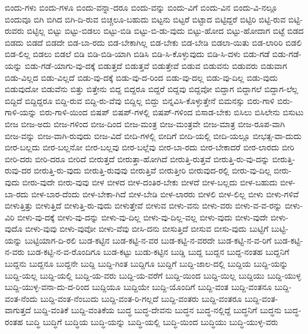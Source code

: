 {ಬಿಂದು-ಗಳು
ಬಿಂದು-ಗಳೂ
ಬಿಂದು-ವನ್ನಾ-ದರೂ
ಬಿಂದು-ವನ್ನು
ಬಿಂದು-ವಿಗೆ
ಬಿಂದು-ವಿನ
ಬಿಂದು-ವಿ-ನಲ್ಲೂ
ಬಿಂದುವೂ
ಬಿಗಿ
ಬಿಗಿದ
ಬಿಗಿ-ದಿ-ರುವ
ಬಿಚ್ಚಲೂ-ಬಹುದು
ಬಿಟ್ಟನು
ಬಿಟ್ಟರೆ
ಬಿಟ್ಟಾದ
ಬಿಟ್ಟಿದ್ದರೆ
ಬಿಟ್ಟಿರಿ
ಬಿಟ್ಟಿ-ರುವ
ಬಿಟ್ಟಿ-ರುವರು
ಬಿಟ್ಟಿಲ್ಲ
ಬಿಟ್ಟು
ಬಿಟ್ಟು-ಬಿಡಲು
ಬಿಟ್ಟು-ಬಿಡಿ
ಬಿಟ್ಟು-ಬಿ-ಡು-ವುದು
ಬಿಟ್ಟು-ಹೋದ
ಬಿಟ್ಟು-ಹೋದಾಗ
ಬಿಟ್ಟೆ
ಬಿಡದ
ಬಿಡದು
ಬಿಡದೆ
ಬಿಡದೇ
ಬಿಡ-ಬಾ-ರದು
ಬಿಡ-ಬೇಕಾಗಿಲ್ಲ
ಬಿಡ-ಬೇಕು
ಬಿಡ-ಬೇಡಿ
ಬಿಡಲಾ-ಯಿತು
ಬಿಡ-ಲಾರಿರಿ
ಬಿಡಲಿ
ಬಿಡ-ಲಿಲ್ಲ
ಬಿಡಲು
ಬಿಡಲೆ
ಬಿಡಿ
ಬಿಡಿ-ಬಿಡಿ-ಯಾಗಿ
ಬಿಡಿಸಿ
ಬಿಡಿ-ಸಿ-ಕೊಳ್ಳುವುದು
ಬಿಡಿ-ಸಿ-ದಳು
ಬಿಡು-ಗಡೆ
ಬಿಡು-ಗಡೆ-ಯನ್ನು
ಬಿಡು-ಗಡೆ-ಯಾಗು-ವು-ದಕ್ಕೆ
ಬಿಡುತ್ತದೆ
ಬಿಡುತ್ತವೆ
ಬಿಡುತ್ತೇವೆ
ಬಿಡುವ
ಬಿಡುವನು
ಬಿಡುವರು
ಬಿಡುವಾಗ
ಬಿಡು-ವಿಲ್ಲದ
ಬಿಡು-ವಿಲ್ಲದೆ
ಬಿಡು-ವು-ದಕ್ಕೆ
ಬಿಡು-ವು-ದ-ರಿಂದ
ಬಿಡು-ವು-ದಲ್ಲ
ಬಿಡು-ವು-ದಿಲ್ಲ
ಬಿಡು-ವುದು
ಬಿಡುವುದೋ
ಬಿಡುವೆನು
ಬಿತ್ತು
ಬಿತ್ತೇನು
ಬಿದ್ದ
ಬಿದ್ದರೂ
ಬಿದ್ದರೆ
ಬಿದ್ದವು
ಬಿದ್ದವೋ
ಬಿದ್ದಾಗ
ಬಿದ್ದಾಗಲೆ
ಬಿದ್ದಾಗ-ಲೆಲ್ಲ
ಬಿದ್ದಿದೆ
ಬಿದ್ದಿದ್ದರೂ
ಬಿದ್ದಿ-ರುವ
ಬಿದ್ದಿ-ರು-ವೆವು
ಬಿದ್ದಿಲ್ಲ
ಬಿದ್ದು
ಬಿನ್ನವಿಸಿ-ಕೊಳ್ಳುತ್ತೇನೆ
ಬಿಮನಸ್ಸು
ಬಿರು-ಗಾಳಿ
ಬಿರು-ಗಾಳಿ-ಯನ್ನು
ಬಿರು-ಗಾಳಿ-ಯಿಂದ
ಬಿಷಪ್
ಬಿಷಪ್-ಗಳಲ್ಲಿ
ಬಿಷಪ್-ಗಳಿಂದ
ಬಿಸಾಡ-ಬೇಕು
ಬಿಸಿಲು
ಬಿಸಿಲೇನು
ಬಿಸುಟು
ಬೀಜ
ಬೀಜ-ಅದು
ಬೀಜ-ಗಳಿಂದ
ಬೀಜ-ದಿಂದ
ಬೀಜ-ಮಂತ್ರ
ಬೀಜ-ಮಂತ್ರವೇ
ಬೀಜ-ಮಾತ್ರ
ಬೀಜ-ರೂಪ-ವಾಗಿ
ಬೀಜ-ವನ್ನು
ಬೀಜ-ವಾಗಿ-ರುವುದು
ಬೀಜ-ವಿದೆ
ಬೀದಿ-ಗಳಲ್ಲಿ
ಬೀದಿಗೆ
ಬೀದಿ-ಯಲ್ಲಿ
ಬೀದಿ-ಯಲ್ಲೂ
ಬೀಭತ್ಸ-ವಾ-ದುದು
ಬೀರ-ಬಲ್ಲದು
ಬೀರ-ಬಲ್ಲನೋ
ಬೀರ-ಬಲ್ಲವು
ಬೀರ-ಬಲ್ಲೆವು
ಬೀರ-ಬಾ-ರದು
ಬೀರ-ಬೇಕಾದರೆ
ಬೀರ-ಲಾರದು
ಬೀರಿ
ಬೀರಿ-ದರು
ಬೀರಿ-ದರೂ
ಬೀರಿದೆ
ಬೀರುತ್ತದೆ
ಬೀರುತ್ತಾ-ಹೋಗಿದೆ
ಬೀರುತ್ತಿ-ರುತ್ತವೆ
ಬೀರುತ್ತಿ-ರು-ವು-ದನ್ನು
ಬೀರುತ್ತಿ-ರುವು-ದರ
ಬೀರುತ್ತಿ-ರು-ವುದು
ಬೀರುತ್ತಿ-ರುವುವು
ಬೀರುತ್ತಿವೆ
ಬೀರುತ್ತೀರಿ
ಬೀರುವುದ-ರಲ್ಲಿ
ಬೀರು-ವು-ದಿಲ್ಲ
ಬೀರು-ವುದು
ಬೀರು-ವುದೇ
ಬೀರು-ವುವು
ಬೀಳ
ಬೀಳದ
ಬೀಳ-ದಂತಿರ-ಬೇಕು
ಬೀಳದೆ
ಬೀಳ-ಬಲ್ಲದು
ಬೀಳ-ಬಹುದು
ಬೀಳ-ಬಾ-ರದು
ಬೀಳ-ಬಾರ-ದೆಂದು
ಬೀಳ-ಬೇಕಾ-ಗಿದೆ
ಬೀಳ-ಬೇಡಿ
ಬೀಳ-ಲಾರರು
ಬೀಳಲಿ
ಬೀಳ-ಲಿಲ್ಲ
ಬೀಳು
ಬೀಳು-ಗಳಿವೆ
ಬೀಳುತ್ತಿತ್ತು
ಬೀಳುತ್ತಿದೆ
ಬೀಳುತ್ತಿ-ರು-ವುದು
ಬೀಳುತ್ತೇವೆ
ಬೀಳುವ
ಬೀಳು-ವನು
ಬೀಳು-ವರು
ಬೀಳು-ವ-ವ-ರನ್ನು
ಬೀಳು-ವಿರಿ
ಬೀಳು-ವು-ದಕ್ಕೆ
ಬೀಳು-ವು-ದನ್ನು
ಬೀಳು-ವು-ದಿಲ್ಲ
ಬೀಳು-ವು-ದಿಲ್ಲ-ವಲ್ಲ
ಬೀಳು-ವುದು
ಬೀಳು-ವುದೇ
ಬೀಳು-ವುದೊ
ಬೀಳು-ವುವು
ಬೀಳು-ವುವೋ
ಬೀಳು-ವೆವು
ಬೀಸಿ-ದನು
ಬೀಸುತ್ತಿದೆ
ಬೀಸುವ
ಬೀಸು-ವುದು
ಬುಟ್ಟಿಗೆ
ಬುಟ್ಟಿ-ಯನ್ನು
ಬುಟ್ಟಿಯಾಗ-ದಿ-ರಲಿ
ಬುಡ-ಕಟ್ಟಿನ
ಬುಡ-ಕಟ್ಟಿ-ನ-ವರ
ಬುಡ-ಕಟ್ಟಿ-ನ-ವರದೇ
ಬುಡ-ಕಟ್ಟಿ-ನ-ವ-ರಿಗೆ
ಬುಡ-ಕಟ್ಟಿ-ನ-ವರು
ಬುಡ-ಕಟ್ಟಿ-ನ-ವ-ರೊಂದಿಗೂ
ಬುಡ-ಕಟ್ಟು
ಬುಡು-ಕಟ್ಟಿನ
ಬುಡ್ಡಿ
ಬುದ್ದ
ಬುದ್ದನ
ಬುದ್ದ-ನಂತಹ
ಬುದ್ದನಿಗೆ
ಬುದ್ದನು
ಬುದ್ದನೂ
ಬುದ್ದನೇ
ಬುದ್ದಿ
ಬುದ್ದಿ-ಗಿಂತ
ಬುದ್ದಿಗೂ
ಬುದ್ದಿಗೆ
ಬುದ್ದಿ-ಜಾಲ-ದಲ್ಲಿ
ಬುದ್ದಿಯ
ಬುದ್ದಿ-ಯನ್ನು
ಬುದ್ದಿ-ಯಲ್ಲ
ಬುದ್ದಿ-ಯಲ್ಲಿ
ಬುದ್ದಿ-ಯ-ವರು
ಬುದ್ದಿ-ಯ-ವರೆಗೆ
ಬುದ್ದಿ-ಯಿಂದ
ಬುದ್ದಿ-ಯಿಲ್ಲ
ಬುದ್ದಿಯು
ಬುದ್ದಿ-ಯುಳ್ಳ
ಬುದ್ದಿ-ಯುಳ್ಳ-ವನಾ-ದು-ದ-ರಿಂದ
ಬುದ್ದಿಯೂ
ಬುದ್ದಿಯೇ
ಬುದ್ದಿ-ಯೊಂದಿಗೆ
ಬುದ್ದಿ-ವಂತ
ಬುದ್ದಿ-ವಂತನೂ
ಬುದ್ದಿ-ವಂತ-ನೆಂದು
ಬುದ್ದಿ-ವಂತ-ನೆಂಬುದು
ಬುದ್ದಿ-ವಂತ-ರಿ-ಗಲ್ಲದೆ
ಬುದ್ದಿ-ವಂತರು
ಬುದ್ದಿ-ವಂತರೂ
ಬುದ್ದಿ-ವಂತ-ವಾಗುತ್ತದೆ
ಬುದ್ದಿ-ವಂತಿಕೆ
ಬುದ್ದಿ-ವಂತಿಕೆಯ
ಬುದ್ಧ
ಬುದ್ಧ-ದೇವನು
ಬುದ್ಧನ
ಬುದ್ಧ-ನಲ್ಲಿದ್ದೆ
ಬುದ್ಧನಿಗೆ
ಬುದ್ಧನು
ಬುದ್ಧ-ರಂತಹ
ಬುದ್ಧಿ
ಬುದ್ಧಿಗೆ
ಬುದ್ಧಿಯ
ಬುದ್ಧಿ-ಯನ್ನು
ಬುದ್ಧಿ-ಯಲ್ಲಿ
ಬುದ್ಧಿ-ಯಿಂದ
ಬುದ್ಧಿಯು
ಬುದ್ಧಿ-ಯುಳ್ಳ-ವರು
}
